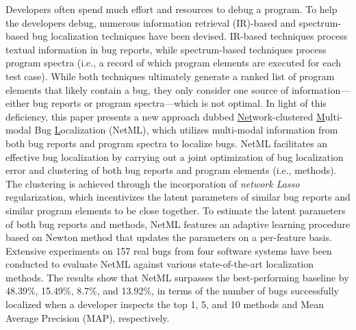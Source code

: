 Developers often spend much effort and resources to debug a program. To help the developers debug, numerous information retrieval (IR)-based and spectrum-based bug localization techniques have been devised. IR-based techniques process textual information in bug reports, while spectrum-based techniques process program spectra (i.e., a record of which program elements are executed for each test case). While both techniques ultimately generate a ranked list of program elements that likely contain a bug, they only consider one source of information---either bug reports or program spectra---which is not optimal. In light of this deficiency, this paper presents a new approach dubbed \underline{Net}work-clustered \underline{M}ulti-modal Bug \underline{L}ocalization (NetML), which utilizes multi-modal information from both bug reports and program spectra to localize bugs. NetML facilitates an effective bug localization by carrying out a joint optimization of bug localization error and clustering of both bug reports and program elements (i.e., methods). The clustering is achieved through the incorporation of \emph{network Lasso} regularization, which incentivizes the latent parameters of similar bug reports and similar program elements to be close together.  To estimate the latent parameters of both bug reports and methods, NetML features an adaptive learning procedure based on Newton method that updates the parameters on a per-feature basis. Extensive experiments on 157 real bugs from four software systems have been conducted to evaluate NetML against various state-of-the-art localization methods. The results show that NetML surpasses the best-performing baseline by 48.39\%, 15.49\%, 8.7\%, and 13.92\%, in terms of the number of bugs successfully localized when a developer inspects the top 1, 5, and 10 methods and Mean Average Precision (MAP), respectively.




